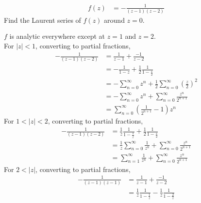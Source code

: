 \documentclass[titlepage, fleqn, a4paper, 12pt, twoside]{article}
\theoremstyle{definition}
\theoremstyle{theorem}
\begin{document}
\begin{question}
	\begin{align*}
		f(z) & = -\frac{1}{(z - 1) (z - 2)}
	\end{align*}
	Find the Laurent series of $f(z)$ around $z = 0$.
\end{question}

\begin{solution}
	$f$ is analytic everywhere except at $z = 1$ and $z = 2$.\\
	For $|z| < 1$, converting to partial fractions,
	\begin{align*}
		-\frac{1}{(z - 1) (z - 2)} & = \frac{1}{z - 1} + \frac{-1}{z - 2}                                                                        \\
                                           & = -\frac{1}{1 - z} + \frac{1}{2} \frac{1}{1 - \frac{z}{2}}                                                  \\
                                           & = -\sum\limits_{n = 0}^{\infty} z^n + \frac{1}{2} \sum\limits_{n = 0}^{\infty} \left( \frac{z}{2} \right)^2 \\
                                           & = -\sum\limits_{n = 0}^{\infty} z^n + \sum\limits_{n = 0}^{\infty} \frac{z^n}{2^{n + 1}}                    \\
                                           & = \sum\limits_{n = 0}^{\infty} \left( \frac{1}{2^{n + 1}} - 1 \right) z^n
	\end{align*}
	For $1 < |z| < 2$, converting to partial fractions,
	\begin{align*}
		-\frac{1}{(z - 1) (z - 2)} & = \frac{1}{z} \frac{1}{1 - \frac{1}{z}} + \frac{1}{2} \frac{1}{1 - \frac{z}{2}}                               \\
                                           & = \frac{1}{z} \sum\limits_{n = 0}^{\infty} \frac{1}{z^n} + \sum\limits_{n = 0}^{\infty} \frac{z^n}{2^{n + 1}} \\
                                           & = \sum\limits_{n = 1}^{\infty} \frac{1}{z^n} + \sum\limits_{n = 0}^{\infty} \frac{z^n}{2^{n + 1}}
	\end{align*}
	For $2 < |z|$, converting to partial fractions,
	\begin{align*}
		-\frac{1}{(z - 1) (z - 1)} & = \frac{1}{z - 1} + \frac{-1}{z - 2}                                                                                             \\
                                           & = \frac{1}{z} \frac{1}{1 - \frac{1}{z}} - \frac{1}{z} \frac{1}{1 - \frac{2}{z}}                                                  \\

\end{align*}
\end{solution}
\end{document}
